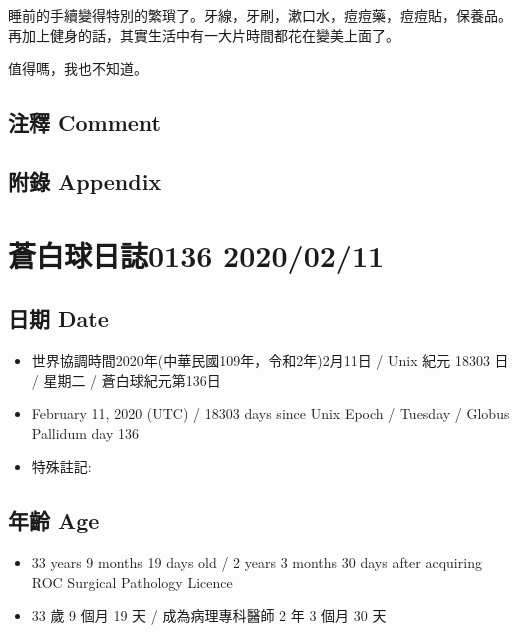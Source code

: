 \documentclass[
]{article}
\providecommand{\tightlist}{%
  \setlength{\itemsep}{0pt}\setlength{\parskip}{0pt}}
\begin{document}
睡前的手續變得特別的繁瑣了。牙線，牙刷，漱口水，痘痘藥，痘痘貼，保養品。再加上健身的話，其實生活中有一大片時間都花在變美上面了。

值得嗎，我也不知道。

\hypertarget{ux6ce8ux91cb-comment-9}{%
\subsection{注釋 Comment}\label{ux6ce8ux91cb-comment-9}}

\hypertarget{ux9644ux9304-appendix-9}{%
\subsection{附錄 Appendix}\label{ux9644ux9304-appendix-9}}

\hypertarget{ux84bcux767dux7403ux65e5ux8a8c0136-20200211}{%
\section{蒼白球日誌0136
2020/02/11}\label{ux84bcux767dux7403ux65e5ux8a8c0136-20200211}}

\hypertarget{ux65e5ux671f-date-10}{%
\subsection{日期 Date}\label{ux65e5ux671f-date-10}}

\begin{itemize}
\tightlist
\item
  世界協調時間2020年(中華民國109年，令和2年)2月11日 / Unix 紀元 18303 日
  / 星期二 / 蒼白球紀元第136日
\item
  February 11, 2020 (UTC) / 18303 days since Unix Epoch / Tuesday /
  Globus Pallidum day 136
\item
  特殊註記:
\end{itemize}

\hypertarget{ux5e74ux9f61-age-10}{%
\subsection{年齡 Age}\label{ux5e74ux9f61-age-10}}

\begin{itemize}
\tightlist
\item
  33 years 9 months 19 days old / 2 years 3 months 30 days after
  acquiring ROC Surgical Pathology Licence
\item
  33 歲 9 個月 19 天 / 成為病理專科醫師 2 年 3 個月 30 天
\end{itemize}
\end{document}
